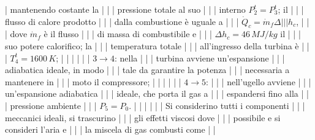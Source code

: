 \documentclass[letterpaper,10pt,italian]{jupyterBook}
\begin{document}
|     mantenendo costante la        |                                   |
|     pressione totale al suo       |                                   |
|     interno \(P_2^t = P_3^t\); il   |                                   |
|     flusso di calore prodotto     |                                   |
|     dalla combustione è uguale a  |                                   |
|     \(\dot{Q}_c = \dot{m}_f \Delta |                                   |
|  h_c\),                            |                                   |
|     dove \(\dot{m}_f\) è il flusso  |                                   |
|     di massa di combustibile e    |                                   |
|     \(\Delta h_c = 46 \, MJ/kg\) il |                                   |
|     suo potere calorifico; la     |                                   |
|     temperatura totale            |                                   |
|     all’ingresso della turbina è  |                                   |
|     \(T_4^t = 1600 \, K\);          |                                   |
|                                   |                                   |
| \sphinxhyphen{}   \(3 \rightarrow 4\): nella      |                                   |
|     turbina avviene un’espansione |                                   |
|     adiabatica ideale, in modo    |                                   |
|     tale da garantire la potenza  |                                   |
|     necessaria a mantenere in     |                                   |
|     moto il compressore;          |                                   |
|                                   |                                   |
| \sphinxhyphen{}   \(4 \rightarrow 5\):            |                                   |
|     nell’ugello avviene           |                                   |
|     un’espansione adiabatica      |                                   |
|     ideale, che porta il gas a    |                                   |
|     espandersi fino alla          |                                   |
|     pressione ambiente            |                                   |
|     \(P_5 = P_0\).                  |                                   |
|                                   |                                   |
| Si considerino tutti i componenti |                                   |
| meccanici ideali, si trascurino   |                                   |
| gli effetti viscosi dove          |                                   |
| possibile e si consideri l’aria e |                                   |
| la miscela di gas combusti come   |                                   |
\end{document}
